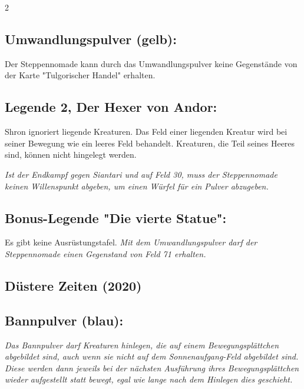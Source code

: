 \documentclass[10pt, a4paper, oneside]{book}
\newcommand{\fan}[1]{\textit{#1}}
\begin{document}
\begin{multicols*}{2}
\begin{bgcolor}[color-AG]
\subsection{Umwandlungspulver (gelb):}

Der Steppennomade kann durch das Umwandlungspulver keine Gegenstände von der Karte "Tulgorischer Handel" erhalten.
\supercite{88659}



\subsection{Legende 2, Der Hexer von Andor:}

Shron ignoriert liegende Kreaturen. Das Feld einer liegenden Kreatur wird bei seiner Bewegung wie ein leeres Feld behandelt. Kreaturen, die Teil seines Heeres sind, können nicht hingelegt werden.
\supercite{AG:Begleitheft}

\fan{Ist der Endkampf gegen Siantari und auf Feld 30, muss der Steppennomade keinen Willenspunkt abgeben, um einen Würfel für ein Pulver abzugeben.}



\subsection{Bonus-Legende "Die vierte Statue":}

Es gibt keine Ausrüstungstafel. \fan{Mit dem Umwandlungspulver darf der Steppennomade einen Gegenstand von Feld 71 erhalten.}

\end{bgcolor}





\columnbreak


\begin{bgcolor}[color-DZ]
\section{Düstere Zeiten (2020)}

\subsection{Bannpulver (blau):}

\fan{Das Bannpulver darf Kreaturen hinlegen, die auf einem Bewegungsplättchen abgebildet sind, auch wenn sie nicht auf dem Sonnenaufgang-Feld abgebildet sind. Diese werden dann jeweils bei der nächsten Ausführung ihres Bewegungsplättchen wieder aufgestellt statt bewegt, egal wie lange nach dem Hinlegen dies geschieht. }


\end{bgcolor}
\end{multicols*}
\end{document}
